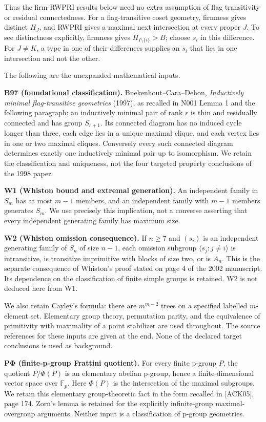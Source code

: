 \documentclass[
  10pt,
  letterpaper,
]{article}
\begin{document}
Thus the firm-RWPRI results below need no extra assumption of flag
transitivity or residual connectedness. For a flag-transitive coset
geometry, firmness gives distinct \(H_J\), and RWPRI gives a maximal
next intersection at every proper \(J\). To see distinctness explicitly,
firmness gives \(H_{I\setminus\{i\}}>B\); choose \(s_i\) in this
difference. For \(J\ne K\), a type in one of their differences supplies
an \(s_i\) that lies in one intersection and not the other.

The following are the unexpanded mathematical inputs.

\textbf{B97 (foundational classification).} Buekenhout--Cara--Dehon,
\emph{Inductively minimal flag-transitive geometries} (1997), as
recalled in N001 Lemma 1 and the following paragraph: an inductively
minimal pair of rank \(r\) is thin and residually connected and has
group \(S_{r+1}\). Its connected diagram has no induced cycle longer
than three, each edge lies in a unique maximal clique, and each vertex
lies in one or two maximal cliques. Conversely every such connected
diagram determines exactly one inductively minimal pair up to
isomorphism. We retain the classification and uniqueness, not the four
targeted property conclusions of the 1998 paper.

\textbf{W1 (Whiston bound and extremal generation).} An independent
family in \(S_m\) has at most \(m-1\) members, and an independent family
with \(m-1\) members generates \(S_m\). We use precisely this
implication, not a converse asserting that every independent generating
family has maximum size.

\textbf{W2 (Whiston omission consequence).} If \(n\geq7\) and \((s_i)\)
is an independent generating family of \(S_n\) of size \(n-1\), each
omission subgroup \(\langle s_j:j\ne i\rangle\) is intransitive, is
transitive imprimitive with blocks of size two, or is \(A_n\). This is
the separate consequence of Whiston's proof stated on page 4 of the 2002
manuscript. Its dependence on the classification of finite simple groups
is retained. W2 is not deduced here from W1.

We also retain Cayley's formula: there are \(m^{m-2}\) trees on a
specified labelled \(m\)-element set. Elementary group theory,
permutation parity, and the equivalence of primitivity with maximality
of a point stabilizer are used throughout. The source references for
these inputs are given at the end. None of the declared target
conclusions is used as background.

\textbf{PΦ (finite-p-group Frattini quotient).} For every finite p-group
\(P\), the quotient \(P/\Phi(P)\) is an elementary abelian p-group,
hence a finite-dimensional vector space over \(\mathbb F_p\). Here
\(\Phi(P)\) is the intersection of the maximal subgroups. We retain this
elementary group-theoretic fact in the form recalled in {[}ACK05{]},
page 174. Zorn's lemma is retained for the explicitly infinite-group
maximal-overgroup arguments. Neither input is a classification of
p-group geometries.
\end{document}
